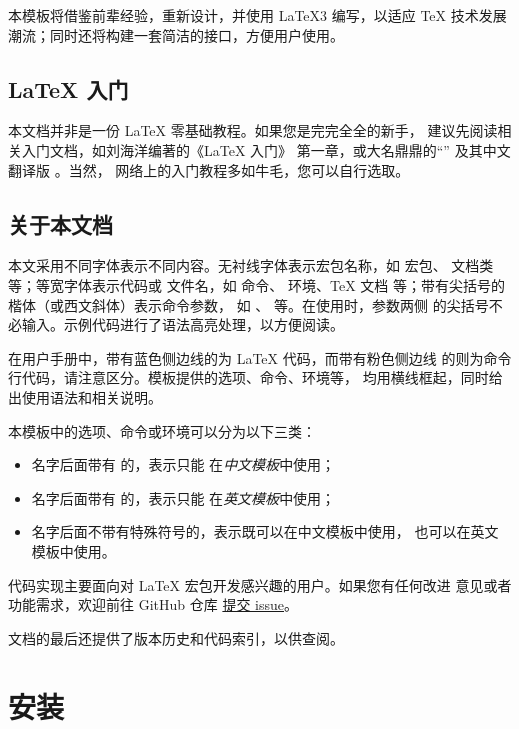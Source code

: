 \documentclass{ccnudoc}
\begin{document}
本模板将借鉴前辈经验，重新设计，并使用 \LaTeX3 编写，以适应 \TeX{} 技术发展潮流；同时还将构建一套简洁的接口，方便用户使用。


\subsection*{\LaTeX{} 入门}

本文档并非是一份 \LaTeX{} 零基础教程。如果您是完完全全的新手，
建议先阅读相关入门文档，如刘海洋编著的《\LaTeX{} 入门》
\cite{刘海洋2013latex入门} 第一章，或大名鼎鼎的“”
\cite{lshort} 及其中文翻译版 \cite{lshort-zh-cn}。当然，
网络上的入门教程多如牛毛，您可以自行选取。

\subsection*{关于本文档}

本文采用不同字体表示不同内容。无衬线字体表示宏包名称，如
 宏包、 文档类等；等宽字体表示代码或
文件名，如  命令、 环境、\TeX{} 文档
 等；带有尖括号的楷体（或西文斜体）表示命令参数，
如 、 等。在使用时，参数两侧
的尖括号不必输入。示例代码进行了语法高亮处理，以方便阅读。

在用户手册中，带有蓝色侧边线的为 \LaTeX{} 代码，而带有粉色侧边线
的则为命令行代码，请注意区分。模板提供的选项、命令、环境等，
均用横线框起，同时给出使用语法和相关说明。

本模板中的选项、命令或环境可以分为以下三类：
\begin{itemize}
  \item 名字后面带有 \rexptarget\rexpstar{} 的，表示只能
    在\emph{中文模板}中使用；
  \item 名字后面带有 \exptarget\expstar{} 的，表示只能
    在\emph{英文模板}中使用；
  \item 名字后面不带有特殊符号的，表示既可以在中文模板中使用，
    也可以在英文模板中使用。
\end{itemize}

代码实现主要面向对 \LaTeX{} 宏包开发感兴趣的用户。如果您有任何改进
意见或者功能需求，欢迎前往 GitHub 仓库
\href{https://github.com/stone-zeng/fduthesis/issues}{提交 issue}。

文档的最后还提供了版本历史和代码索引，以供查阅。

\section{安装}
\end{document}
